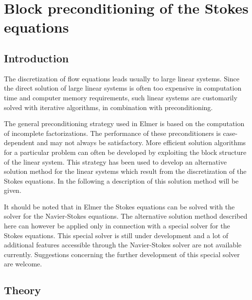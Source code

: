 \chapter{Block preconditioning of the Stokes equations}
\noindent
{}

\section{Introduction}

The discretization of flow equations leads usually to large linear systems. Since
the direct solution of large linear systems is often too expensive in computation time 
and computer memory requirements, such linear systems are customarily solved
with iterative algorithms, in combination with preconditioning.

The general preconditioning strategy used in Elmer is based on the computation of 
incomplete factorizations. The performance of these preconditioners 
is case-dependent and may
not always be satisfactory. More efficient solution algorithms for a particular
problem can often be developed by exploiting the block structure of the 
linear system. This strategy has been used to develop an alternative
solution method for the linear systems which result from the discretization
of the Stokes equations. In the following a description of this solution 
method will be given.

It should be noted that in Elmer the Stokes equations can be solved with the solver 
for the Navier-Stokes equations. The alternative
solution method described here can however be applied only in connection with 
a special solver for the Stokes equations. This special solver is still
under development and a lot of additional features accessible through 
the Navier-Stokes solver are not available currently.       
Suggestions concerning the further development of this special solver are welcome.   


\section{Theory}

